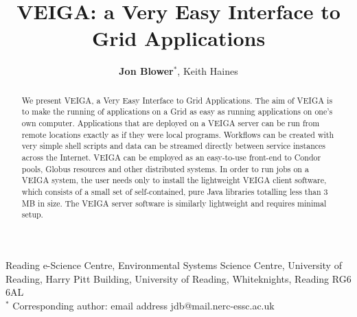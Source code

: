 \documentclass[a4paper]{article}
\begin{document}
\title{VEIGA: a Very Easy Interface to Grid Applications}

\author{\textbf{Jon Blower$^{*}$}, Keith Haines}
\date{}

\maketitle

\begin{center}
Reading e-Science Centre, Environmental Systems Science Centre, University of Reading, Harry Pitt Building, University of Reading, Whiteknights, Reading RG6 6AL \\
\medskip
$^{*}$ Corresponding author: email address jdb@mail.nerc-essc.ac.uk
\end{center}

\bigskip

\begin{abstract}
We present VEIGA, a Very Easy Interface to Grid Applications.  The aim of VEIGA is to make the running of applications on a Grid as easy as running applications on one's own computer.  Applications that are deployed on a VEIGA server can be run from remote locations exactly as if they were local programs.  Workflows can be created with very simple shell scripts and data can be streamed directly between service instances across the Internet.  VEIGA can be employed as an easy-to-use front-end to Condor pools, Globus resources and other distributed systems.  In order to run jobs on a VEIGA system, the user needs only to install the lightweight VEIGA client software, which consists of a small set of self-contained, pure Java libraries totalling less than 3 MB in size.  The VEIGA server software is similarly lightweight and requires minimal setup.
\end{abstract}

\bigskip
\end{document}

